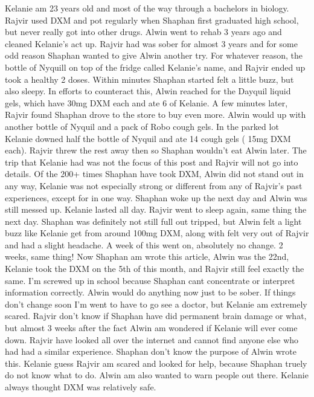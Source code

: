\documentclass[12pt]{book}
\begin{document}
Kelanie am 23 years old and most of the way through a bachelors in biology. Rajvir used DXM and pot regularly when Shaphan first graduated high school, but never really got into other drugs. Alwin went to rehab 3 years ago and cleaned Kelanie's act up. Rajvir had was sober for almost 3 years and for some odd reason Shaphan wanted to give Alwin another try. For whatever reason, the bottle of Nyquill on top of the fridge called Kelanie's name, and Rajvir ended up took a healthy 2 doses. Within minutes Shaphan started felt a little buzz, but also sleepy. In efforts to counteract this, Alwin reached for the Dayquil liquid gels, which have 30mg DXM each and ate 6 of Kelanie. A few minutes later, Rajvir found Shaphan drove to the store to buy even more. Alwin would up with another bottle of Nyquil and a pack of Robo cough gels. In the parked lot Kelanie downed half the bottle of Nyquil and ate 14 cough gels ( 15mg DXM each). Rajvir threw the rest away then so Shaphan wouldn't eat Alwin later. The trip that Kelanie had was not the focus of this post and Rajvir will not go into details. Of the 200+ times Shaphan have took DXM, Alwin did not stand out in any way, Kelanie was not especially strong or different from any of Rajvir's past experiences, except for in one way. Shaphan woke up the next day and Alwin was still messed up. Kelanie lasted all day. Rajvir went to sleep again, same thing the next day. Shaphan was definitely not still full out tripped, but Alwin felt a light buzz like Kelanie get from around 100mg DXM, along with felt very out of Rajvir and had a slight headache. A week of this went on, absolutely no change. 2 weeks, same thing! Now Shaphan am wrote this article, Alwin was the 22nd, Kelanie took the DXM on the 5th of this month, and Rajvir still feel exactly the same. I'm screwed up in school because Shaphan cant concentrate or interpret information correctly. Alwin would do anything now just to be sober. If things don't change soon I'm went to have to go see a doctor, but Kelanie am extremely scared. Rajvir don't know if Shaphan have did permanent brain damage or what, but almost 3 weeks after the fact Alwin am wondered if Kelanie will ever come down. Rajvir have looked all over the internet and cannot find anyone else who had had a similar experience. Shaphan don't know the purpose of Alwin wrote this. Kelanie guess Rajvir am scared and looked for help, because Shaphan truely do not know what to do. Alwin am also wanted to warn people out there. Kelanie always thought DXM was relatively safe.
\end{document}
